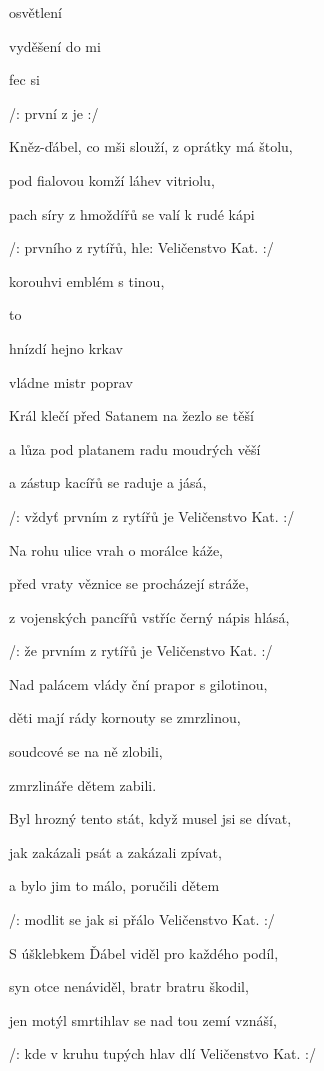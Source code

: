 

			

\zs
{} osvětlení  

 vyděšení  do mi

fec  si 

/:  první z  je   :/
\ks

\zs
Kněz-ďábel, co mši slouží, z oprátky má štolu,

pod fialovou komží láhev vitriolu,

pach síry z hmoždířů se valí k rudé kápi

/: prvního z rytířů, hle: Veličenstvo Kat. :/
\ks

\zr
{} korouhvi   emblém s tinou,

   to 

 hnízdí hejno krkav

 vládne mistr poprav
\kr

\zs
Král klečí před Satanem na žezlo se těší

a lůza pod platanem radu moudrých věší

a zástup kacířů se raduje a jásá,

/: vždyť prvním z rytířů je Veličenstvo Kat. :/
\ks

\zs
Na rohu ulice vrah o morálce káže,

před vraty věznice se procházejí stráže,

z vojenských pancířů vstříc černý nápis hlásá,

/: že prvním z rytířů je Veličenstvo Kat. :/
\ks

\zr
Nad palácem vlády ční prapor s gilotinou,

děti mají rády kornouty se zmrzlinou,

soudcové se na ně zlobili,

zmrzlináře dětem zabili.
\kr

\zs
Byl hrozný tento stát, když musel jsi se dívat,

jak zakázali psát a zakázali zpívat,

a bylo jim to málo, poručili dětem

/: modlit se jak si přálo Veličenstvo Kat. :/
\ks

\zs
S úšklebkem Ďábel viděl pro každého podíl,

syn otce nenáviděl, bratr bratru škodil,

jen motýl smrtihlav se nad tou zemí vznáší,

/: kde v kruhu tupých hlav dlí Veličenstvo Kat. :/
\ks

\kp






